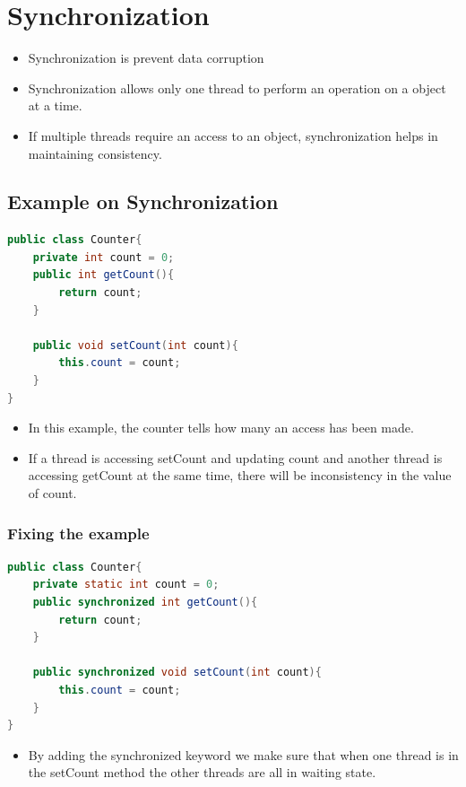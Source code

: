 \documentclass[12pt, a4paper]{book}
\begin{document}
\section{Synchronization}
\begin{itemize}
    \item Synchronization is prevent data corruption
    \item Synchronization allows only one thread to perform an operation on a object at a time.
    \item If multiple threads require an access to an object, synchronization helps in maintaining consistency.
\end{itemize}
\subsection{Example on Synchronization}
\begin{lstlisting}[language=java]
public class Counter{
    private int count = 0;
    public int getCount(){
        return count;
    }

    public void setCount(int count){
        this.count = count;
    }
}
\end{lstlisting}
\begin{itemize}
    \item In this example, the counter tells how many an access has been made.
    \item If a thread is accessing setCount and updating count and another thread is accessing getCount at the same time, there will be inconsistency in the value of count.
\end{itemize}
\subsubsection{Fixing the example}
\begin{lstlisting}[language=java]
public class Counter{
	private static int count = 0;
	public synchronized int getCount(){
		return count;
	}

	public synchronized void setCount(int count){
    	this.count = count;
	}
}
\end{lstlisting}
\begin{itemize}
    \item By adding the synchronized keyword we make sure that when one thread is in the setCount method the other threads are all in waiting state.
\end{itemize}
\end{document}
